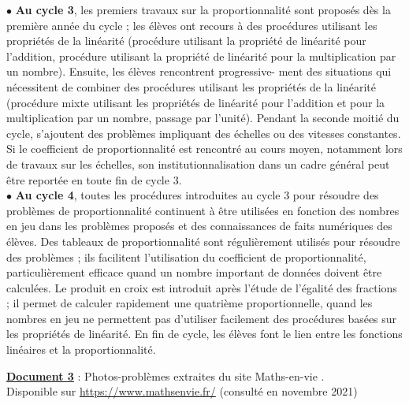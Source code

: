 \begin{center}
   \begin{minipage}{15cm}
      \begin{flushleft}
         \textsf{$\bullet$ {\bf Au cycle 3}, les premiers travaux sur la proportionnalité sont proposés dès la première année du cycle ; les élèves ont recours à des procédures utilisant les propriétés de la linéarité (procédure utilisant la propriété de linéarité pour l’addition, procédure utilisant la propriété de linéarité pour la multiplication par un nombre). Ensuite, les élèves rencontrent progressive- ment des situations qui nécessitent de combiner des procédures utilisant les propriétés de la linéarité (procédure mixte utilisant les propriétés de linéarité pour l’addition et pour la multiplication par un nombre, passage par l’unité). Pendant la seconde moitié du cycle, s’ajoutent des problèmes impliquant des échelles ou des vitesses constantes. Si le coefficient de proportionnalité est rencontré au cours moyen, notamment lors de travaux sur les échelles, son institutionnalisation dans un cadre général peut être reportée en toute fin de cycle 3. \\
         $\bullet$ {\bf Au cycle 4}, toutes les procédures introduites au cycle 3 pour résoudre des problèmes de proportionnalité continuent à être utilisées en fonction des nombres en jeu dans les problèmes proposés et des connaissances de faits numériques des élèves. Des tableaux de proportionnalité sont régulièrement utilisés pour résoudre des problèmes ; ils facilitent l’utilisation du coefficient de proportionnalité, particulièrement efficace quand un nombre important de données doivent être calculées. Le produit en croix est introduit après l’étude de l’égalité des fractions ; il permet de calculer rapidement une quatrième proportionnelle, quand les nombres en jeu ne permettent pas d’utiliser facilement des procédures basées sur les propriétés de linéarité. En fin de cycle, les élèves font le lien entre les fonctions linéaires et la proportionnalité.}
      \end{flushleft}
   \end{minipage}
\end{center}
  
\bigskip


{\bf\uline{Document 3}} : Photos-problèmes extraites du site \og Maths-en-vie \fg. \\
Disponible sur \href{https://www.mathsenvie.fr/}{https://www.mathsenvie.fr/} (consulté en novembre 2021) \medskip

